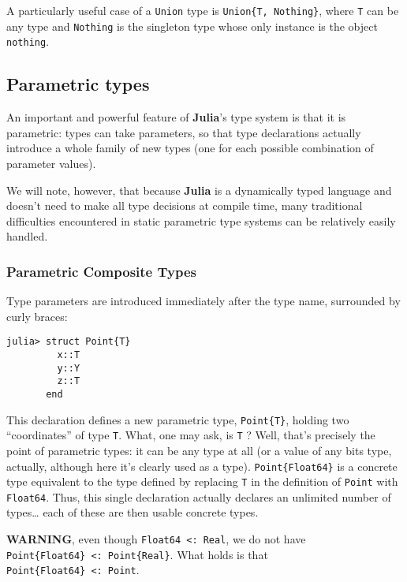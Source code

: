 \documentclass[
]{article}
\begin{document}
A particularly useful case of a \texttt{Union} type is
\texttt{Union\{T,\ Nothing\}}, where \texttt{T} can be any type and
\texttt{Nothing} is the singleton type whose only instance is the object
\texttt{nothing}.

\hypertarget{parametric-types}{%
\subsection{Parametric types}\label{parametric-types}}

An important and powerful feature of \textbf{Julia}'s type system is
that it is parametric: types can take parameters, so that type
declarations actually introduce a whole family of new types (one for
each possible combination of parameter values).

We will note, however, that because \textbf{Julia} is a dynamically
typed language and doesn't need to make all type decisions at compile
time, many traditional difficulties encountered in static parametric
type systems can be relatively easily handled.

\hypertarget{parametric-composite-types}{%
\subsubsection{Parametric Composite
Types}\label{parametric-composite-types}}

Type parameters are introduced immediately after the type name,
surrounded by curly braces:

\begin{verbatim}
julia> struct Point{T}
         x::T
         y::Y
         z::T
       end
\end{verbatim}

This declaration defines a new parametric type, \texttt{Point\{T\}},
holding two ``coordinates'' of type \texttt{T}. What, one may ask, is
\texttt{T} ? Well, that's precisely the point of parametric types: it
can be any type at all (or a value of any bits type, actually, although
here it's clearly used as a type). \texttt{Point\{Float64\}} is a
concrete type equivalent to the type defined by replacing \texttt{T} in
the definition of \texttt{Point} with \texttt{Float64}. Thus, this
single declaration actually declares an unlimited number of
types\ldots{} each of these are then usable concrete types.

\textbf{WARNING}, even though \texttt{Float64\ \textless{}:\ Real}, we
do not have \texttt{Point\{Float64\}\ \textless{}:\ Point\{Real\}}. What
holds is that \texttt{Point\{Float64\}\ \textless{}:\ Point}.
\end{document}
